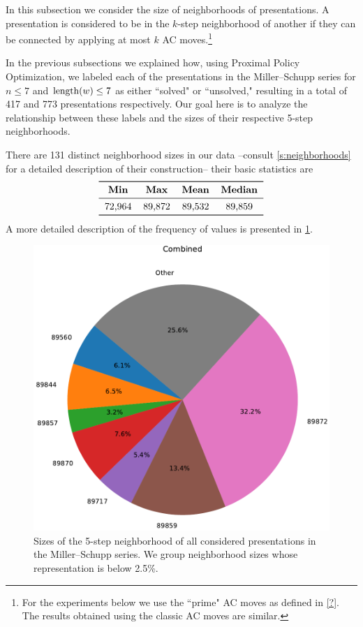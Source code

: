 
In this subsection we consider the size of neighborhoods of presentations.
A presentation is considered to be in the $k$-step neighborhood of another if they can be connected by applying at most $k$ AC moves.\footnote{For the experiments below we use the ``prime" AC moves as defined in \cref{?}. The results obtained using the classic AC moves are similar.}

In the previous subsections we explained how, using Proximal Policy Optimization, we labeled each of the presentations in the Miller–Schupp series for $n \leq 7$ and $\operatorname{length}(w) \leq 7$ as either ``solved" or ``unsolved," resulting in a total of 417 and 773 presentations respectively.
Our goal here is to analyze the relationship between these labels and the sizes of their respective 5-step neighborhoods.

There are 131 distinct neighborhood sizes in our data --consult \cref{s:neighborhoods} for a detailed description of their construction-- their basic statistics are
\[
\begin{tabular}{cccccc}
	\toprule
	\textbf{Min} & \textbf{Max} & \textbf{Mean} & \textbf{Median} \\
	\midrule
	72,964 & 89,872 & 89,532 & 89,859 \\
	\bottomrule
\end{tabular}
\]
A more detailed description of the frequency of values is presented in \cref{fig:prime_combined_pie}.

\begin{figure}
	\includegraphics[scale=.4]{fig/prime_combined_pie_rl_cropped.pdf}
	\caption{Sizes of the 5-step neighborhood of all considered presentations in the Miller–Schupp series. We group neighborhood sizes whose representation is below 2.5\%.}
	\label{fig:prime_combined_pie}
\end{figure}

